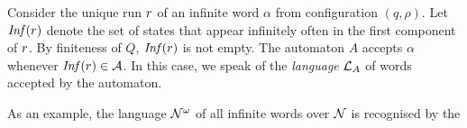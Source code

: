 \begin{definition}\label{def:acceptance-of-hdmas}
 Consider the unique run $r$ of an infinite word $\alpha$ from configuration $(q,\rho)$. 
 Let $\mathit{Inf}(r)$ denote the set  of states that appear infinitely often in the first component of $r$. By finiteness of $Q$, $\mathit{Inf}(r)$ is not empty. The automaton $A$ accepts $\alpha$ whenever $\mathit{Inf}(r) \in \mathcal{A}$. In this case, we speak of the \emph{language} $\mathcal{L}_A$ of words accepted by the automaton.
\end{definition}
%
%	
%
%
%	
%
%
%
%
%
%
As an example, the language $\mathcal{N}^\omega$ of all infinite words over $\mathcal{N}$ is recognised by the \hdma\ %
